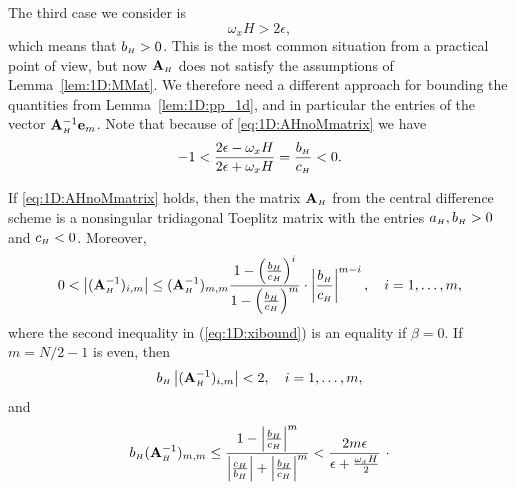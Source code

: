 The third case we consider is
%
\begin{equation}\label{eq:1D:AHnoMmatrix}
\omega_x H >  2\epsilon,
\end{equation}
%
which means that $b_{\scriptscriptstyle H}>0$. This is the most common situation from a
practical point of view, but now $\mathbf{A}_{\scriptscriptstyle H}$ does not satisfy the assumptions of
Lemma~\ref{lem:1D:MMat}. We therefore need a different approach for bounding
the quantities from Lemma~\ref{lem:1D:pp_1d}, and in particular the entries of
the vector $\mathbf{A}_{\scriptscriptstyle H}^{-1} \mathbf{e}_m$. Note that because of \eqref{eq:1D:AHnoMmatrix}
we have
%
$$ -1 < \frac{2\epsilon-\omega_x H}{2\epsilon+\omega_x H}=
\frac{b_{\scriptscriptstyle H}}{c_{\scriptscriptstyle H}}<0.$$


\begin{lemma}\label{lem:1D:usmani}
If \eqref{eq:1D:AHnoMmatrix} holds, then the matrix $\mathbf{A}_{\scriptscriptstyle H}$ from the central
difference scheme is a nonsingular tridiagonal Toeplitz matrix with the
entries $a_{\scriptscriptstyle H},b_{\scriptscriptstyle H}>0$ and $c_{\scriptscriptstyle H}<0$. Moreover,
%
\begin{equation}\label{eq:1D:xibound}
0< \left|(\mathbf{A}_{\scriptscriptstyle H}^{-1})_{i,m}\right|\leq (\mathbf{A}_{\scriptscriptstyle H}^{-1})_{m,m}
\frac{1-\left(\frac{b_{\scriptscriptstyle H}}{c_{\scriptscriptstyle H}}\right)^{i}}{1-\left(\frac{b_{\scriptscriptstyle H}}{c_{\scriptscriptstyle H}}\right)^{m}}\cdot\left|\frac{b_{\scriptscriptstyle H}}{c_{\scriptscriptstyle H}}\right|^{m-i},
\quad i=1,\dots, m,
\end{equation}
%
where the second inequality in \textrm{(\ref{eq:1D:xibound})} is an equality if
$\beta=0$.
%
If $m=N/2-1$ is even, then
%
\begin{equation}\label{eq:1D:bdtwo}
b_{\scriptscriptstyle H} \left|(\mathbf{A}_{\scriptscriptstyle H}^{-1})_{i,m}\right| < 2,\quad i=1,\dots,m,
\end{equation}
%
and
%
\begin{equation}\label{eq:1D:xim}
b_{\scriptscriptstyle H} (\mathbf{A}_{\scriptscriptstyle H}^{-1})_{m,m} \leq\frac{1-\left|\frac{b_{\scriptscriptstyle H}}{c_{\scriptscriptstyle H}}\right|^{m}}{\left|\frac{c_{\scriptscriptstyle H}}{b_{\scriptscriptstyle H}}\right|+\left|\frac{b_{\scriptscriptstyle H}}{c_{\scriptscriptstyle H}}\right|^{m}}
<	\frac{2m\epsilon}{\epsilon+\frac{\omega_x H}{2}} ~\cdot
\end{equation}
%
\end{lemma}


